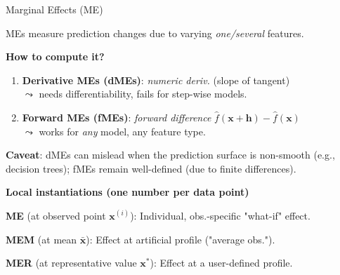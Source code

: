 \documentclass[10pt,compress,t,notes=noshow, xcolor=table]{beamer}
\begin{document}
\begin{framei}[align=top]{Marginal Effects (ME)  }
\item %
MEs measure prediction changes due to varying \emph{one/several} features.
\item \textbf{How to compute it?}
\begin{enumerate}
\item \textbf{Derivative MEs (dMEs)}: \emph{numeric deriv.} (slope of tangent) \\
$\leadsto$ needs differentiability, fails for step-wise models.
\item \textbf{Forward MEs (fMEs)}: \emph{forward difference} $\hat f(\boldsymbol x+\boldsymbol h)-\hat f(\boldsymbol x)$ \\
$\leadsto$ works for \emph{any} model, any feature type.
\end{enumerate}
\item \textbf{Caveat}: dMEs can mislead when the prediction surface is non-smooth (e.g., decision trees); fMEs remain well-defined (due to finite differences).
\pause
\item \textbf{Local instantiations (one number per data point)}
\begin{itemizeS}
\item \textbf{ME} (at observed point $\boldsymbol{x}^{(i)}$): Individual, obs.-specific "what-if" effect.
\item \textbf{MEM} (at mean $\bar{\boldsymbol{x}}$): Effect at artificial profile ("average obs.").
\item \textbf{MER} (at representative value $\boldsymbol{x}^{*}$): Effect at a user-defined profile.
\end{itemizeS}

\end{framei}
\end{document}
